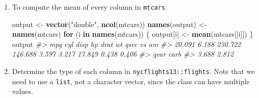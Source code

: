 \documentclass[]{book}
\newenvironment{Shaded}{\begin{snugshade}}{\end{snugshade}}
\newcommand{\CommentTok}[1]{\textcolor[rgb]{0.56,0.35,0.01}{\textit{#1}}}
\newcommand{\ControlFlowTok}[1]{\textcolor[rgb]{0.13,0.29,0.53}{\textbf{#1}}}
\newcommand{\KeywordTok}[1]{\textcolor[rgb]{0.13,0.29,0.53}{\textbf{#1}}}
\newcommand{\NormalTok}[1]{#1}
\newcommand{\StringTok}[1]{\textcolor[rgb]{0.31,0.60,0.02}{#1}}
\theoremstyle{plain}
\theoremstyle{remark}
\begin{document}
\begin{enumerate}
\def\labelenumi{\arabic{enumi}.}
\item
  To compute the mean of every column in \texttt{mtcars}.

\begin{Shaded}
\begin{Highlighting}[]
\NormalTok{output <-}\StringTok{ }\KeywordTok{vector}\NormalTok{(}\StringTok{"double"}\NormalTok{, }\KeywordTok{ncol}\NormalTok{(mtcars))}
\KeywordTok{names}\NormalTok{(output) <-}\StringTok{ }\KeywordTok{names}\NormalTok{(mtcars)}
\ControlFlowTok{for}\NormalTok{ (i }\ControlFlowTok{in} \KeywordTok{names}\NormalTok{(mtcars)) \{}
\NormalTok{  output[i] <-}\StringTok{ }\KeywordTok{mean}\NormalTok{(mtcars[[i]])}
\NormalTok{\}}
\NormalTok{output}
\CommentTok{#>     mpg     cyl    disp      hp    drat      wt    qsec      vs      am }
\CommentTok{#>  20.091   6.188 230.722 146.688   3.597   3.217  17.849   0.438   0.406 }
\CommentTok{#>    gear    carb }
\CommentTok{#>   3.688   2.812}
\end{Highlighting}
\end{Shaded}
\item
  Determine the type of each column in \texttt{nycflights13::flights}.
  Note that we need to use a \texttt{list}, not a character vector, since the class can have multiple values.


\end{enumerate}
\end{document}
